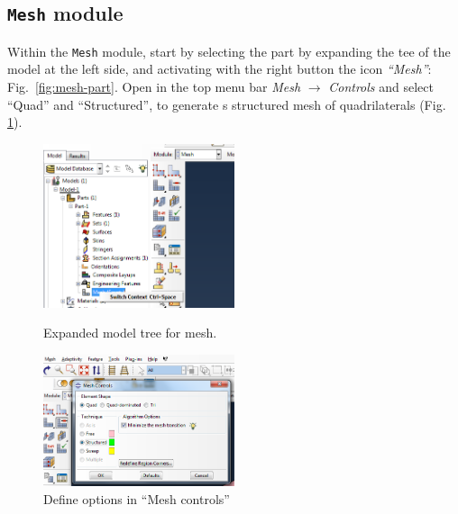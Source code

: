 \documentclass[english,a4paper,12pt]{article}
\begin{document}
\subsection{\texttt{Mesh} module}

Within the \texttt{Mesh} module, start by selecting the part by expanding the tee of the model at the left side, and activating with the right button the icon \emph{``Mesh''}:
Fig.~\ref{fig:mesh-part}.
Open in the top menu bar \emph{Mesh} $\to$ \emph{Controls} and select ``Quad'' and ``Structured'', to generate s structured mesh of quadrilaterals 
(Fig. \ref{fig:mesh-controls}).
\begin{figure}[h!tp]
\parbox[t]{0.49\textwidth}{%
\includegraphics[width=0.5\textwidth]{capturas/29-mesh.png}
\caption{Expanded model tree for mesh.}
\label{fig:mesh-part}%
}\quad
\parbox[t]{0.49\textwidth}{%
\includegraphics[width=0.5\textwidth]{capturas/30-mesh.png}
\caption{Define options in ``Mesh controls''}
\label{fig:mesh-controls}%
}%
\end{figure}
\end{document}
